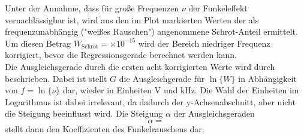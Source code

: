 	Unter der Annahme, dass für große Frequenzen $\nu$ der Funkeleffekt
	vernachlässigbar ist, wird aus den im Plot markierten Werten der als
	frequenzunabhängig ("weißes Rauschen") angenommene Schrot-Anteil ermittelt.
	Um diesen Betrag $W_\text{Schrot}=\times
	10^{-15}$ wird der
	Bereich niedriger Frequenz korrigiert, bevor die Regressionsgerade berechnet
	werden kann.\\

	Die Ausgleichsgerade durch die ersten acht korrigierten Werte wird durch
	\begin{equation}
	
	\end{equation}
	beschrieben. Dabei ist stellt $G$ die Ausgleichgerade für $\ln\{W\}$ in Abhängigkeit
	von $f=\ln\{\nu\}$ dar, wieder in Einheiten V und kHz. Die Wahl der Einheiten im
	Logarithmus ist dabei irrelevant, da dadurch der y-Achsenabschnitt, aber nicht
	die Steigung beeinflusst wird. Die Steigung $\alpha$ der
	Ausgleichsgeraden
	\begin{equation}
	\alpha = 
	\end{equation}
	stellt dann den Koeffizienten des Funkelrauschens dar.
